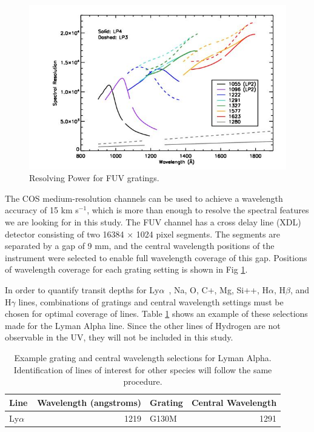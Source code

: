 \documentclass[onecolumn]{aastex63}
\newcommand\lya{Ly$\alpha$\ }
\begin{document}
\begin{figure}
    \centering
    \includegraphics{spec.jpg}
    \caption{Resolving Power for FUV gratings.}
    \label{fig:my_label}
\end{figure}

The COS medium-resolution channels can be used to achieve a wavelength accuracy of 15 km s$^{-1}$, which is more than enough to resolve the spectral features we are looking for in this study. The FUV channel has a cross delay line (XDL) detector consisting of two 16384 $\times$ 1024 pixel segments. The segments are separated by a gap of 9 mm, and the central wavelength positions of the instrument were selected to enable full wavelength coverage of this gap. Positions of wavelength coverage for each grating setting is shown in Fig \ref{fig:my_label}.

In order to quantify transit depths for \lya, Na, O, C+, Mg, Si++, H$\alpha$, H$\beta$, and H$\gamma$ lines, combinations of gratings and central wavelength settings must be chosen for optimal coverage of lines. Table \ref{tab:my_label} shows an example of these selections made for the Lyman Alpha line. Since the other lines of Hydrogen are not observable in the UV, they will not be included in this study.

\begin{table}[]
    \centering
    \begin{tabular}{lrlr}
        Line & Wavelength (angstroms) & Grating & Central Wavelength \\
        \hline
        \lya & 1219 & G130M & 1291\\
    \end{tabular}
    \caption{Example grating and central wavelength selections for Lyman Alpha. Identification of lines of interest for other species will follow the same procedure.}
    \label{tab:my_label}
\end{table}
\end{document}
